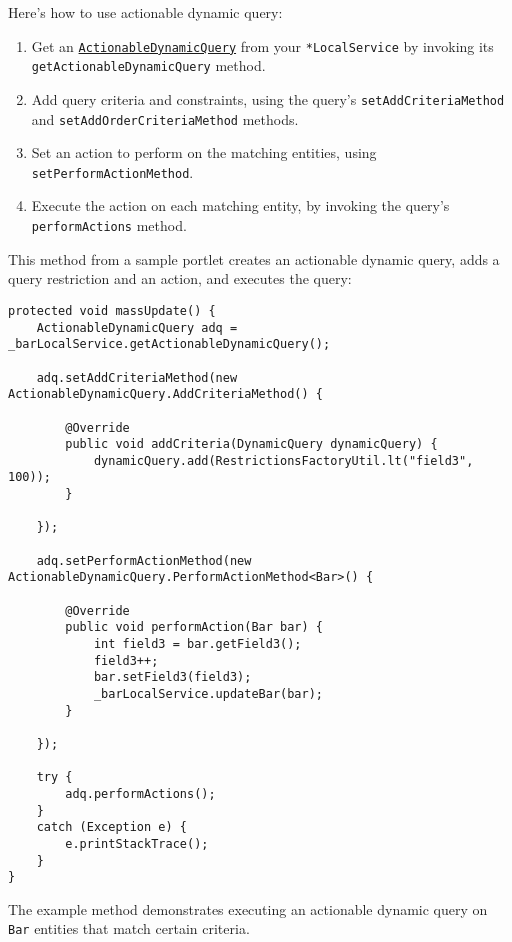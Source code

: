 Here's how to use actionable dynamic query:

\begin{enumerate}
\def\labelenumi{\arabic{enumi}.}
\item
  Get an
  \href{https://docs.liferay.com/dxp/portal/7.2-latest/javadocs/portal-kernel/com/liferay/portal/kernel/dao/orm/ActionableDynamicQuery.html}{\texttt{ActionableDynamicQuery}}
  from your \texttt{*LocalService} by invoking its
  \texttt{getActionableDynamicQuery} method.
\item
  Add query criteria and constraints, using the query's
  \texttt{setAddCriteriaMethod} and \texttt{setAddOrderCriteriaMethod}
  methods.
\item
  Set an action to perform on the matching entities, using
  \texttt{setPerformActionMethod}.
\item
  Execute the action on each matching entity, by invoking the query's
  \texttt{performActions} method.
\end{enumerate}

This method from a sample portlet creates an actionable dynamic query,
adds a query restriction and an action, and executes the query:

\begin{verbatim}
protected void massUpdate() {
    ActionableDynamicQuery adq = _barLocalService.getActionableDynamicQuery();
    
    adq.setAddCriteriaMethod(new ActionableDynamicQuery.AddCriteriaMethod() {
        
        @Override
        public void addCriteria(DynamicQuery dynamicQuery) {
            dynamicQuery.add(RestrictionsFactoryUtil.lt("field3", 100));
        }
        
    });
    
    adq.setPerformActionMethod(new ActionableDynamicQuery.PerformActionMethod<Bar>() {
        
        @Override
        public void performAction(Bar bar) {
            int field3 = bar.getField3();
            field3++;
            bar.setField3(field3);
            _barLocalService.updateBar(bar);
        }
        
    });
    
    try {
        adq.performActions();
    }
    catch (Exception e) {
        e.printStackTrace();
    }
}
\end{verbatim}

The example method demonstrates executing an actionable dynamic query on
\texttt{Bar} entities that match certain criteria.

